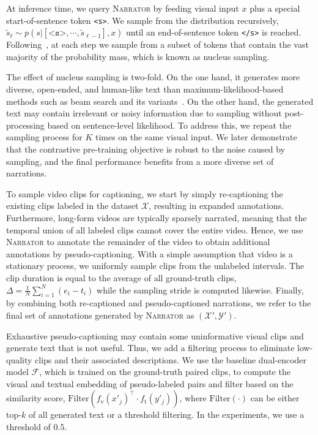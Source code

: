 \documentclass[10pt,twocolumn,letterpaper]{article}
\newcommand{\calX}{\mathcal{X}}
\newcommand{\calY}{\mathcal{Y}}
\newcommand{\myparagraph}[1]{\vspace{0pt}\noindent{\bf #1}}
\newcommand{\narrator}{\textsc{Narrator}\xspace}
\begin{document}
\myparagraph{Inference.}
At inference time, we query \narrator by feeding visual input $x$ plus a special start-of-sentence token \texttt{<s>}. We sample from the distribution recursively,~\ie $\tilde{s}_\ell \sim p(s| [\texttt{<s>}, \cdots, \tilde{s}_{\ell-1}],x)$ until an end-of-sentence token \texttt{</s>} is reached.
Following~\cite{holtzman2020curious},
at each step we sample from a subset of tokens that contain the vast majority of the probability mass, which is known as nucleus sampling.

The effect of nucleus sampling is two-fold.
On the one hand, it generates more diverse, open-ended, and human-like text than maximum-likelihood-based methods such as beam search and its variants~\cite{vijayakumar2016diverse}.
On the other hand, the generated text may contain irrelevant or noisy information due to sampling without post-processing based on sentence-level likelihood.
To address this, we repeat the sampling process for $K$ times on the same visual input.
We later demonstrate that the contrastive pre-training objective is robust to the noise caused by sampling, and the final performance benefits from a more diverse set of narrations. 


To sample video clips for captioning, we start by simply re-captioning the existing clips labeled in the dataset $\calX$, resulting in expanded annotations. Furthermore, long-form videos are typically sparsely narrated, meaning that the temporal union of all labeled clips cannot cover the entire video.
Hence, we use \narrator to annotate the remainder of the video to obtain additional annotations by pseudo-captioning.
With a simple assumption that video is a stationary process, we uniformly sample clips from the unlabeled intervals.
The clip duration is equal to the average of all ground-truth clips,~\ie $\Delta = \frac{1}{N}\sum_{i=1}^N(e_i - t_i) $ while the sampling stride is computed likewise.
Finally, by combining both re-captioned and pseudo-captioned narrations, we refer to the final set of annotations generated by \narrator as $(\calX', \calY')$.






\myparagraph{Post-processing.}
Exhaustive pseudo-captioning may contain some uninformative visual clips and generate text that is not useful.
Thus, we add a filtering process to eliminate low-quality clips and their associated descriptions.
We use the baseline dual-encoder model $\mathcal{F}$, which is trained on the ground-truth paired clips, to compute the visual and textual embedding of pseudo-labeled pairs and filter based on the similarity score, \ie $\mathrm{Filter}(f_\mathrm{v}(x'_j)^\top \cdot f_\mathrm{t}(y'_j))$, where $\mathrm{Filter}(\cdot)$ can be either top-$k$ of all generated text or a threshold filtering.
In the experiments, we use a threshold of $0.5$.
\end{document}
